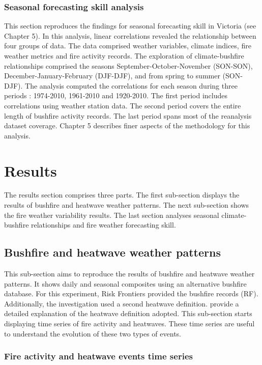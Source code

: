 \subsubsection{Seasonal forecasting skill analysis}

This section reproduces the findings for seasonal forecasting skill
in Victoria (see Chapter 5). In this analysis, linear correlations
revealed the relationship between four groups of data. The data comprised
weather variables, climate indices, fire weather metrics and fire
activity records. The exploration of climate-bushfire relationships
comprised the seasons September-October-November (SON-SON), December-January-February
(DJF-DJF), and from spring to summer (SON-DJF). The analysis computed
the correlations for each season during three periods : 1974-2010,
1961-2010 and 1920-2010. The first period includes correlations using
weather station data. The second period covers the entire length of
bushfire activity records. The last period spans most of the reanalysis
dataset coverage. Chapter 5 describes finer aspects of the methodology
for this analysis.


\section{Results}

The results section comprises three parts. The first sub-section displays
the results of bushfire and heatwave weather patterns. The next sub-section
shows the fire weather variability results. The last section analyses
seasonal climate-bushfire relationships and fire weather forecasting
skill.


\subsection{Bushfire and heatwave weather patterns}

This sub-section aims to reproduce the results of bushfire and heatwave
weather patterns. It shows daily and seasonal composites using an
alternative bushfire database. For this experiment, Risk Frontiers
provided the bushfire records (RF). Additionally, the investigation
used a second heatwave definition. \citet{Pezza2012} provide a detailed
explanation of the heatwave definition adopted. This sub-section starts
displaying time series of fire activity and heatwaves. These time
series are useful to understand the evolution of these two types of
events. 


\subsubsection{Fire activity and heatwave events time series}


